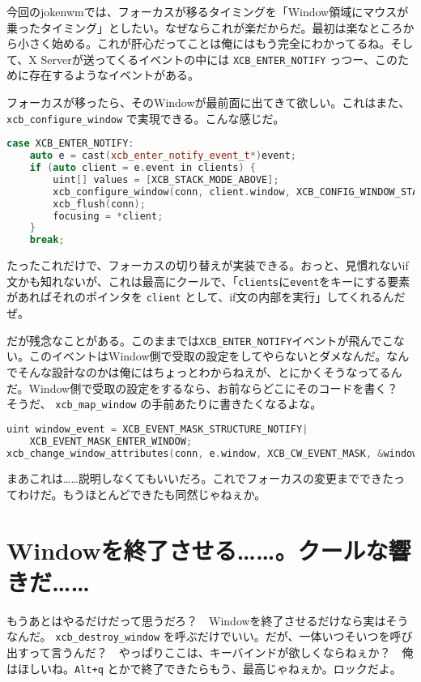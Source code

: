 \documentclass[12pt,a4paper]{jsarticle}
\begin{document}
今回のjokenwmでは、フォーカスが移るタイミングを「Window領域にマウスが乗ったタイミング」としたい。なぜならこれが楽だからだ。最初は楽なところから小さく始める。これが肝心だってことは俺にはもう完全にわかってるね。そして、X Serverが送ってくるイベントの中には \lstinline{XCB_ENTER_NOTIFY} っつー、このために存在するようなイベントがある。

フォーカスが移ったら、そのWindowが最前面に出てきて欲しい。これはまた、 \lstinline{xcb_configure_window} で実現できる。こんな感じだ。

\begin{lstlisting}[language=C++]
case XCB_ENTER_NOTIFY:
	auto e = cast(xcb_enter_notify_event_t*)event;
	if (auto client = e.event in clients) {
		uint[] values = [XCB_STACK_MODE_ABOVE];
		xcb_configure_window(conn, client.window, XCB_CONFIG_WINDOW_STACK_MODE, values.ptr);
		xcb_flush(conn);
		focusing = *client;
	}
	break;
\end{lstlisting}

たったこれだけで、フォーカスの切り替えが実装できる。おっと、見慣れないif文かも知れないが、これは最高にクールで、「\lstinline{clients}に\lstinline{event}をキーにする要素があればそれのポインタを \lstinline{client} として、if文の内部を実行」してくれるんだぜ。

だが残念なことがある。このままでは\lstinline{XCB_ENTER_NOTIFY}イベントが飛んでこない。このイベントはWindow側で受取の設定をしてやらないとダメなんだ。なんでそんな設計なのかは俺にはちょっとわからねえが、とにかくそうなってるんだ。Window側で受取の設定をするなら、お前ならどこにそのコードを書く？　そうだ、 \lstinline{xcb_map_window} の手前あたりに書きたくなるよな。

\begin{lstlisting}[language=C++]
uint window_event = XCB_EVENT_MASK_STRUCTURE_NOTIFY|
	XCB_EVENT_MASK_ENTER_WINDOW;
xcb_change_window_attributes(conn, e.window, XCB_CW_EVENT_MASK, &window_event);
\end{lstlisting}

まあこれは……説明しなくてもいいだろ。これでフォーカスの変更までできたってわけだ。もうほとんどできたも同然じゃねぇか。

\section{Windowを終了させる……。クールな響きだ……}

もうあとはやるだけだって思うだろ？　Windowを終了させるだけなら実はそうなんだ。 \lstinline{xcb_destroy_window} を呼ぶだけでいい。だが、一体いつそいつを呼び出すって言うんだ？　やっぱりここは、キーバインドが欲しくならねぇか？　俺はほしいね。\lstinline{Alt+q} とかで終了できたらもう、最高じゃねぇか。ロックだよ。
\end{document}
